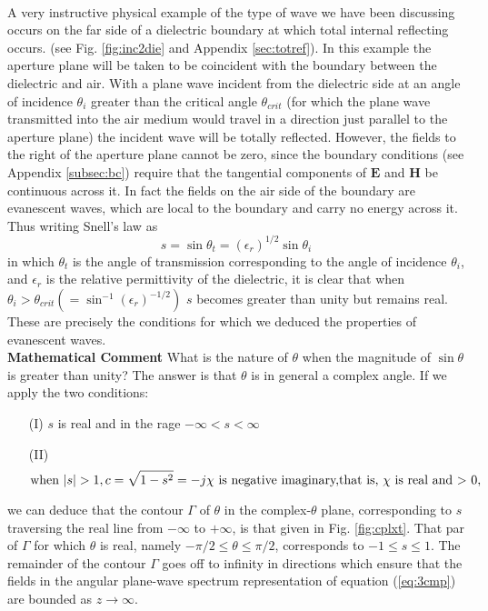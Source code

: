 \\
A very instructive physical example of the type of wave we have been discussing occurs on the far side of a dielectric boundary at which total internal reflecting occurs. (see Fig. \ref{fig:inc2die} and Appendix \ref{sec:totref}). In this example the aperture plane will be taken to be coincident with the boundary between the dielectric and air. With a plane wave incident from the dielectric side at an angle of incidence $\theta_i$ greater than the critical angle $\theta_{crit}$ (for which the plane wave transmitted into the air medium would travel in a direction just parallel to the aperture plane) the incident wave will be totally reflected. However, the fields to the right of the aperture plane cannot be zero, since the boundary conditions (see Appendix \ref{subsec:bc}) require that the tangential components of $\mathbf{E}$ and $\mathbf{H}$ be continuous across it. In fact the fields on the air side of the boundary are evanescent waves, which are local to the boundary and carry no energy across it. Thus writing Snell's law as
\begin{equation}
s=\sin\theta_t=(\epsilon_r)^{1/2}\sin\theta_i
\end{equation}
in which $\theta_t$ is the angle of transmission corresponding to the angle of incidence $\theta_i$, and $\epsilon_r$ is the relative permittivity of the dielectric, it is clear that when $\theta_i>\theta_{crit}(=\sin^{-1}(\epsilon_r)^{-1/2})$ $s$ becomes greater than unity but remains real. These are precisely the conditions for which we deduced the properties of evanescent waves.\\

\noindent\textbf{Mathematical Comment}
\noindent What is the nature of $\theta$ when the magnitude of $\sin\theta$ is greater than unity? The answer is that $\theta$ is in general a complex angle. If we apply the two conditions:
\begin{itemize}
	\item [(I)]
	$s$ is real and in the rage $-\infty<s<\infty$
	\item [(II)]\begin{equation}
	\text{when } |s| > 1, c=\sqrt{1-s^2}=-j\chi \text{ is negative imaginary,\linebreak that is, $\chi$ is real and $>$ 0,}
	\end{equation}
\end{itemize}
we can deduce that the contour $\Gamma$ of $\theta$ in the complex-$\theta$ plane, corresponding to $s$ traversing the real line from $-\infty$ to $+\infty$, is that given in Fig. \ref{fig:cplxt}. That par of $\Gamma$ for which $\theta$ is real, namely $-\pi/2\leqslant\theta\leqslant\pi/2$, corresponds to $-1\leqslant s\leqslant1$. The remainder of the contour $\Gamma$ goes off to infinity in directions which ensure that the fields in the angular plane-wave spectrum representation of equation (\ref{eq:3cmp}) are bounded as $z\longrightarrow\infty$.

